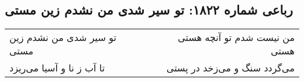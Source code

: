 \begin{center}
\section*{رباعی شماره ۱۸۲۲: تو سیر شدی من نشدم زین مستی}
\label{sec:1822}
\begin{longtable}{l p{0.5cm} r}
تو سیر شدی من نشدم زین مستی
&&
من نیست شدم تو آنچه هستی هستی
\\
تا آب ز نا و آسیا می‌ریزد
&&
می‌گردد سنگ و می‌زخد در پستی
\\
\end{longtable}
\end{center}
